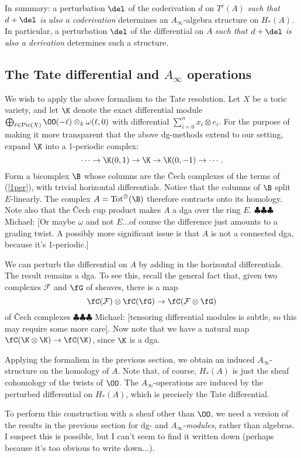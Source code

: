 \documentclass[12pt]{amsart}
\theoremstyle{definition}
\theoremstyle{remark}
\newcommand{\Pic}{\operatorname{Pic}}
\newcommand{\F}{\FF}
\newcommand{\michael}[1]{{\color{red} \sf $\clubsuit\clubsuit\clubsuit$ Michael: [#1]}}
\def\on{\operatorname}
\def\F{\mathcal{F}}
\def\o{\omega}
\def\l{\ell}
\begin{document}
In summary: a perturbation $\del$ of the coderivation $d$ on $T^c(A)$ \emph{such that $d + \del$ is also a coderivation} determines an $A_\infty$-algebra structure on $H_*(A)$. In particular, a perturbation $\del$ of the differential on $A$ \emph{such that $d + \del$ is also a derivation} determines such a structure.


\subsection{The Tate differential and $A_\infty$ operations}
We wish to apply the above formalism to the Tate resolution.
Let $X$ be a toric variety, and let $\K$ denote the exact differential module $\bigoplus_{\l \in \Pic(X)} \OO(-\l) \otimes_k \o(\l, 0)$ with differential $\sum_{i = 0}^n x_i \otimes e_i$. For the purpose of making it more transparent that the above dg-methods extend to our setting, expand $\K$ into a 1-periodic complex:
\begin{equation}
\label{1per}
\cdots \to \K(0, 1) \to \K \to \K(0, -1)  \to \cdots.
\end{equation}
Form a bicomplex $\B$ whose columns are the \v{C}ech complexes of the terms of (\ref{1per}), with trivial horizontal differentials. Notice that the columns of $\B$ split $E$-linearly. The complex $A = \on{Tot}^{\oplus}(\B)$ therefore contracts onto its homology. Note also that the \v{C}ech cup product makes $A$ a dga over the ring $E$. \michael{Or maybe $\o$ and not $E$...of course the difference just amounts to a grading twist. A possibly more significant issue is that $A$ is not a connected dga, because it's 1-periodic.}

We can perturb the differential on $A$ by adding in the horizontal differentials. The result remains a dga. To see this, recall the general fact that, given two complexes $\F$ and $\fG$ of sheaves, there is a map
$$
\fC(\F) \otimes \fC(\fG) \to \fC(\F \otimes \fG)
$$
of \v{C}ech complexes \michael{tensoring differential modules is subtle, so this may require some more care}. Now note that we have a natural map $\fC(\K \otimes \K) \to \fC(\K)$, since $\K$ is a dga. 

Applying the formalism in the previous section, we obtain an induced $A_\infty$-structure on the homology of $A$. Note that, of course, $H_*(A)$  is just the sheaf cohomology of the twists of $\OO$. The $A_\infty$-operations are induced by the perturbed differential on $H_*(A)$, which is precisely the Tate differential. 

To perform this construction with a sheaf other than $\OO$, we need a version of the results in the previous section for dg- and $A_\infty$-\emph{modules}, rather than algebras. I suspect this is possible, but I can't seem to find it written down (perhaps because it's too obvious to write down...).




\end{document}
